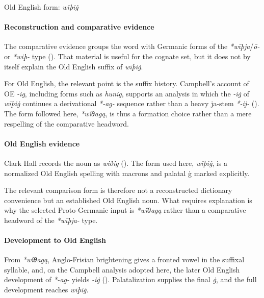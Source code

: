 \documentclass[
  british,
  a4paper,
]{article}
\begin{document}
Old English form: \emph{wīþiġ}

\paragraph{Reconstruction and comparative
evidence}\label{reconstruction-and-comparative-evidence-36}

The comparative evidence groups the word with Germanic forms of the
\emph{*wīþja}/\emph{ō-} or \emph{*wiþ-} type
(). That material is useful for
the cognate set, but it does not by itself explain the Old English
suffix of \emph{wīþiġ}.

For Old English, the relevant point is the suffix history. Campbell's
account of OE \emph{-ig}, including forms such as \emph{hunig}, supports
an analysis in which the \emph{-iġ} of \emph{wīþiġ} continues a
derivational \emph{*-ag-} sequence rather than a heavy ja-stem
\emph{*-ij-} (). The form followed here, \emph{*wī́θagą}, is thus a formation
choice rather than a mere respelling of the comparative headword.

\paragraph{Old English evidence}\label{old-english-evidence-36}

Clark Hall records the noun as \emph{wiðig}
(). The form used
here, \emph{wīþiġ}, is a normalized Old English spelling with macrons
and palatal ġ marked explicitly.

The relevant comparison form is therefore not a reconstructed dictionary
convenience but an established Old English noun. What requires
explanation is why the selected Proto-Germanic input is \emph{*wī́θagą}
rather than a comparative headword of the \emph{*wīþja-} type.

\paragraph{Development to Old
English}\label{development-to-old-english-36}

From \emph{*wī́θagą}, Anglo-Frisian brightening gives a fronted vowel in
the suffixal syllable, and, on the Campbell analysis adopted here, the
later Old English development of \emph{*-ag-} yields \emph{-iġ}
().
Palatalization supplies the final \emph{ġ}, and the full development
reaches \emph{wīþiġ}.
\end{document}
